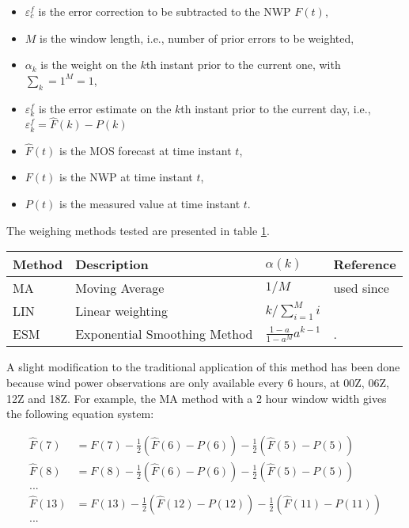\begin{itemize}
    \item $\varepsilon_c^f$ is the error correction to be subtracted to the NWP $F(t)$, 
    \item $M$ is the window length, i.e., number of prior errors to be weighted, 
    \item $\alpha_k$ is the weight on the $k$th instant prior to the current one, with $\sum_k=1^M = 1$,
    \item $\varepsilon_k^f$ is the error estimate on the $k$th instant prior to the current day, i.e., $\varepsilon_k^f = \hat{F}(k) - P(k)$
    \item $\hat{F}(t)$ is the MOS forecast at time instant $t$,
    \item $F(t)$ is the NWP at time instant $t$,
    \item $P(t)$ is the measured value at time instant $t$.
\end{itemize}


The weighing methods tested are presented in table \ref{tb:umos}. 

\begin{table}[!htp]
    \small
    \centering
    \label{tb:umos}
    \begin{tabular}{llll}
        \toprule
        Method & Description & $\alpha(k)$ & Reference \\
        \midrule
        MA & Moving Average                & $1/M$              & used since \cite{WilsonVallee2002} \\
        LIN & Linear weighting             & $k/\sum_{i=1}^M i$ & \cite{Stull2008} \\
        ESM & Exponential Smoothing Method & $\frac{1-a}{1-a^M} a^{k-1}$  & \cite{YussoufStensrud2007}. \\
        \bottomrule
    \end{tabular}
\end{table}
\FloatBarrier

A slight modification to the traditional application of this method has been done because wind power observations are only available every 6 hours, at 00Z, 06Z, 12Z and 18Z. For example, the MA method with a 2 hour window width gives the following equation system:

\begin{align}
    \hat{F}(7) &= F(7) - \frac{1}{2} \left( \hat{F}(6)-P(6) \right) - \frac{1}{2} \left( \hat{F}(5)-P(5) \right) \\
    \hat{F}(8) &= F(8) - \frac{1}{2} \left( \hat{F}(6)-P(6) \right) - \frac{1}{2} \left( \hat{F}(5)-P(5) \right) \\
    \nonumber ... \\
    \hat{F}(13) &= F(13) - \frac{1}{2} \left( \hat{F}(12)-P(12) \right) - \frac{1}{2} \left( \hat{F}(11)-P(11) \right) \\
    \nonumber ... \\
\end{align}

